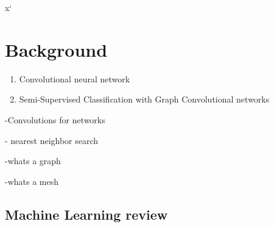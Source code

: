 x`\chapter{Background}
\label{sec:background}

\begin{enumerate}
    \item Convolutional neural network
    \item Semi-Supervised Classification with Graph Convolutional networks
\end{enumerate}
-Convolutions for networks

- nearest neighbor search

-whats a graph

-whats a mesh
\section{Machine Learning review}
\label{ml_review}



